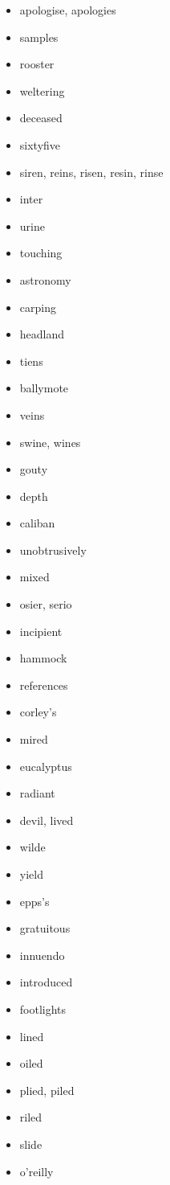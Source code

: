 \documentclass{article}
\begin{document}
\begin{itemize}
    \item apologise, apologies
    \item samples
    \item rooster
    \item weltering
    \item deceased
    \item sixtyfive
    \item siren, reins, risen, resin, rinse
    \item inter
    \item urine
    \item touching
    \item astronomy
    \item carping
    \item headland
    \item tiens
    \item ballymote
    \item veins
    \item swine, wines
    \item gouty
    \item depth
    \item caliban
    \item unobtrusively
    \item mixed
    \item osier, serio
    \item incipient
    \item hammock
    \item references
    \item corley's
    \item mired
    \item eucalyptus
    \item radiant
    \item devil, lived
    \item wilde
    \item yield
    \item epps's
    \item gratuitous
    \item innuendo
    \item introduced
    \item footlights
    \item lined
    \item oiled
    \item plied, piled
    \item riled
    \item slide
    \item o'reilly

\end{itemize}
\end{document}
